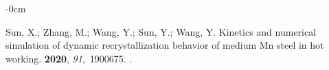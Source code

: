 \documentclass[metals,article,accept,pdftex,moreauthors]{Definitions/mdpi}
\begin{document}
\begin{adjustwidth}{-\extralength}{0cm}
\begin{thebibliography}{999}
Sun, X.; Zhang, M.; Wang, Y.; Sun, Y.; Wang, Y.
\newblock Kinetics and numerical simulation of dynamic recrystallization
  behavior of medium Mn steel in hot working.
 {\bf 2020}, {\em 91},~1900675.
.

\end{thebibliography}


%


\PublishersNote{}
\end{adjustwidth}
\end{document}
